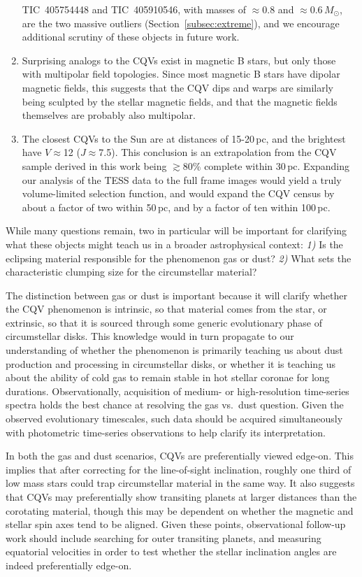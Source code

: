 \documentclass[11pt,twocolumn,tighten]{aastex63}
\begin{document}
\begin{enumerate}[leftmargin=*]
      TIC~405754448 and TIC~405910546, with masses of $\approx$0.8 and
      $\approx$0.6\,$M_\odot$, are the two massive outliers
      (Section~\ref{subsec:extreme}), and we encourage additional
      scrutiny of these objects in future work.
    \item Surprising analogs to the CQVs exist in magnetic B stars,
    but only those with multipolar field topologies.  Since most
    magnetic B stars have dipolar magnetic fields, this suggests
    that the CQV dips and warps are similarly being sculpted by the
    stellar magnetic fields, and that the magnetic fields themselves
    are probably also multipolar.
    \item The closest CQVs to the Sun are at distances of 15-20\,pc,
      and the brightest have $V$$\approx$12 ($J$$\approx$7.5).  This
      conclusion is an extrapolation from the CQV sample derived in
      this work being $\gtrsim$80\% complete within 30\,pc.  Expanding
      our analysis of the TESS data to the full frame images would
      yield a truly volume-limited selection function, and would
      expand the CQV census by about a factor of two within 50\,pc,
      and by a factor of ten within 100\,pc.
\end{enumerate}

While many questions remain, two in particular will be important for
clarifying what these objects might teach us in a broader
astrophysical context: {\it 1)} Is the eclipsing material responsible
for the phenomenon gas or dust?  {\it 2)} What sets the characteristic
clumping size for the circumstellar material?

The distinction between gas or dust is important because it will
clarify whether the CQV phenomenon is intrinsic, so that material
comes from the star, or extrinsic, so that it is sourced through some
generic evolutionary phase of circumstellar disks.  This knowledge
would in turn propagate to our understanding of whether the phenomenon
is primarily teaching us about dust production and processing in
circumstellar disks, or whether it is teaching us about the ability of
cold gas to remain stable in hot stellar coronae for long durations.
Observationally, acquisition of medium- or high-resolution time-series
spectra holds the best chance at resolving the gas vs.~dust question.
Given the observed evolutionary timescales, such data should be
acquired simultaneously with photometric time-series observations to
help clarify its interpretation.

In both the gas and dust scenarios, CQVs are preferentially viewed
edge-on.  This implies that after correcting for the line-of-sight
inclination, roughly one third of low mass stars
\citep{2022AJ....163..144G} could trap circumstellar material in the
same way.  It also suggests that CQVs may preferentially show
transiting planets at larger distances than the corotating material,
though this may be dependent on whether the magnetic and stellar spin
axes tend to be aligned.  Given these points, observational follow-up
work should include searching for outer transiting planets, and
measuring equatorial velocities in order to test whether the stellar
inclination angles are indeed preferentially edge-on.
\end{document}
